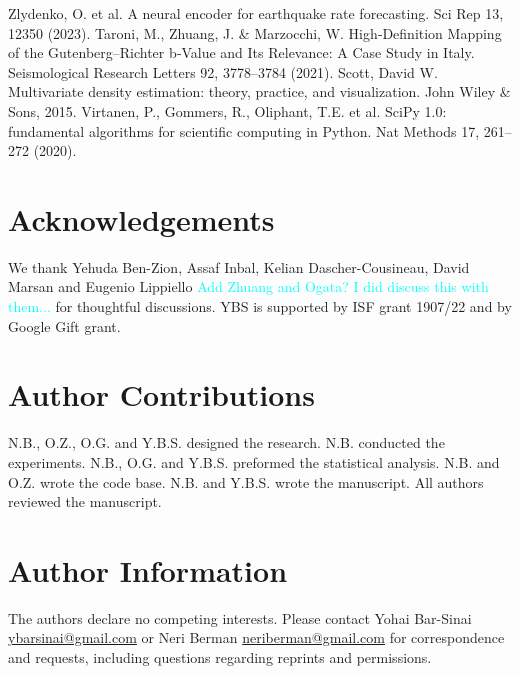 \documentclass[pdflatex]{sn-jnl}
\newcommand{\neri}[1]{{\textcolor{cyan}{#1}}}
\begin{document}
\newpage
\renewcommand\refname{Methods References}
\begin{thebibliography}{10}
Zlydenko, O. et al. A neural encoder for earthquake rate forecasting. Sci Rep 13, 12350 (2023).
Taroni, M., Zhuang, J. \& Marzocchi, W. High‐Definition Mapping of the Gutenberg–Richter b‐Value and Its Relevance: A Case Study in Italy. Seismological Research Letters 92, 3778–3784 (2021).
Scott, David W. Multivariate density estimation: theory, practice, and visualization. John Wiley \& Sons, 2015.  
Virtanen, P., Gommers, R., Oliphant, T.E. et al. SciPy 1.0: fundamental algorithms for scientific computing in Python. Nat Methods 17, 261–272 (2020).





\end{thebibliography}


\newpage
\section*{Acknowledgements}
We thank Yehuda Ben-Zion, Assaf Inbal, Kelian Dascher-Cousineau, David Marsan and Eugenio Lippiello \neri{Add Zhuang and Ogata? I did discuss this with them...} for thoughtful discussions. YBS is supported by ISF grant 1907/22 and by Google Gift grant.

\section*{Author Contributions}
N.B., O.Z., O.G. and Y.B.S. designed the research. N.B. conducted the experiments. N.B., O.G. and Y.B.S. preformed the statistical analysis. N.B. and O.Z. wrote the code base. N.B. and Y.B.S. wrote the manuscript. All authors reviewed the manuscript.

\section*{Author Information}
The authors declare no competing interests. Please contact Yohai Bar-Sinai \href{mailto:ybarsinai@gmail.com}{ybarsinai@gmail.com} or Neri Berman \href{mailto:neriberman@gmail.com}{neriberman@gmail.com} for correspondence and requests, including questions regarding reprints and permissions.
\end{document}
